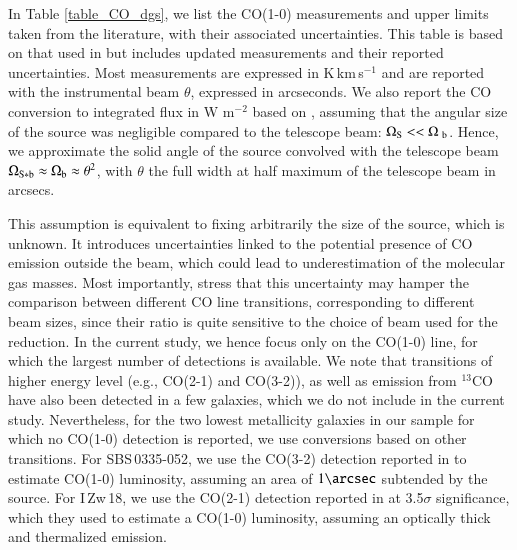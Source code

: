 \documentclass{aa}
\begin{document}
In Table \ref{table_CO_dgs}, we list the CO(1-0) measurements and upper limits taken from the literature, with their associated uncertainties. This table is based on that used in  but includes updated measurements and their reported uncertainties. Most measurements are expressed in K\,km\,s$^{-1}$ and are reported with the instrumental beam $\theta$, expressed in arcseconds. We also report the CO conversion to integrated flux in W m$^{-2}$ based on \cite{Solomon_1997}, assuming that the angular size of the source was negligible compared to the telescope beam: $\Omega_{\rm S} << \Omega_{\ \rm b}$. Hence, we approximate the solid angle of the source convolved with the telescope beam $\Omega_{\rm S * b} \approx \Omega_{\rm b} \approx \theta^2$, with $\theta$ the full width at half maximum of the telescope beam in arcsecs. 

This assumption is equivalent to fixing arbitrarily the size of the source, which is unknown. 
It introduces uncertainties linked to the potential presence of CO emission outside the beam, which could lead to underestimation of the molecular gas masses. Most importantly, \cite{Cormier_2014} stress that this uncertainty may hamper the comparison between different CO line transitions, corresponding to different beam sizes, since their ratio is quite sensitive to the choice of beam used for the reduction. In the current study, we hence focus only on the CO(1-0) line, for which the largest number of detections is available. We note that transitions of higher energy level (e.g., CO(2-1) and CO(3-2)), as well as emission from $^{13}$CO have also been detected in a few galaxies, which we do not include in the current study. Nevertheless, for the two lowest metallicity galaxies in our sample for which no CO(1-0) detection is reported, we use conversions based on other transitions. For SBS\,0335-052, we use the CO(3-2) detection reported in \cite{Hunt_2014} to estimate CO(1-0) luminosity, assuming an area of $1\arcsec$ subtended by the source. For I\,Zw\,18, we use the CO(2-1) detection reported in \cite{Zhou_co_2021} at 3.5$\sigma$ significance, which they used to estimate a CO(1-0) luminosity, assuming an optically thick and thermalized emission. 
\end{document}
